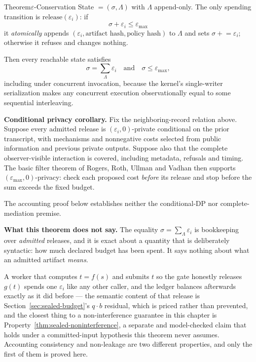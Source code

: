\documentclass[11pt,a4paper]{article}
\theoremstyle{definition}
\begin{document}
\begin{pdclaim}{Theorem}{$\varepsilon$-Conservation}
\label{thm:sealed-conservation}
\setlength{\parskip}{4pt plus 1pt}
State $=(\sigma,\Lambda)$ with $\Lambda$ append-only. The only spending
transition is $\mathrm{release}(\varepsilon_i)$: if
\[
\sigma+\varepsilon_i\le\varepsilon_{\max}
\]
it \emph{atomically} appends
$(\varepsilon_i,\text{artifact hash},\text{policy hash})$ to $\Lambda$ and sets
$\sigma\mathrel{+}=\varepsilon_i$; otherwise it refuses and changes nothing.

Then every reachable state satisfies
\[
\sigma=\sum_{\Lambda}\varepsilon_i
\quad\text{and}\quad
\sigma\le\varepsilon_{\max},
\]
including under concurrent invocation, because
the kernel's single-writer serialization makes any concurrent execution
observationally equal to some sequential interleaving.

\textbf{Conditional privacy corollary.} Fix the neighboring-record relation
above. Suppose every admitted release is $(\varepsilon_i,0)$-private conditional
on the prior transcript, with mechanisms and nonnegative costs selected from
public information and previous private outputs. Suppose also that the complete observer-visible interaction is
covered, including metadata, refusals and timing. The basic filter theorem of
Rogers, Roth, Ullman and Vadhan  then supports
$(\varepsilon_{\max},0)$-privacy: check each proposed cost \emph{before} its
release and stop before the sum exceeds the fixed budget.

The accounting proof below establishes neither the conditional-DP nor
complete-mediation premise.

\textbf{What this theorem does not say.} The equality
$\sigma=\sum_{\Lambda}\varepsilon_i$ is bookkeeping over \emph{admitted}
releases, and it is exact about a quantity that is deliberately syntactic: how
much declared budget has been spent. It says nothing about what an admitted
artifact \emph{means}.

A worker that computes $t=f(s)$ and submits $t$ so the
gate honestly releases $g(t)$ spends one $\varepsilon_i$ like any other caller,
and the ledger balances afterwards exactly as it did before --- the semantic
content of that release is Section~\ref{sec:sealed-budget}'s $q\cdot b$
residual, which is priced rather than prevented, and the closest thing to a
non-interference guarantee in this chapter is
Property~\ref{thm:sealed-noninterference}, a separate and model-checked claim
that holds under a committed-input hypothesis this theorem never assumes.
Accounting consistency and non-leakage are two different properties, and only
the first of them is proved here.
\end{pdclaim}
\end{document}
